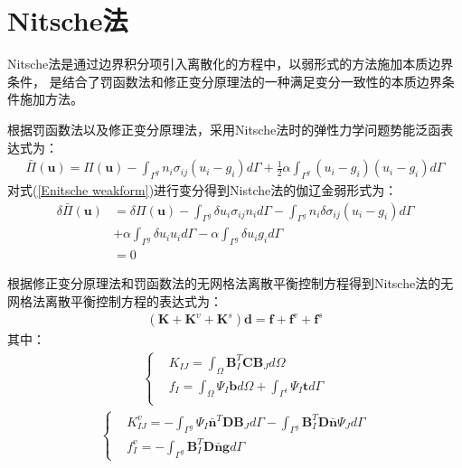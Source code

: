 \section{Nitsche法}
Nitsche法\cite{}是通过边界积分项引入离散化的方程中，以弱形式的方法施加本质边界条件，
是结合了罚函数法和修正变分原理法的一种满足变分一致性的本质边界条件施加方法。\par
根据罚函数法以及修正变分原理法，采用Nitsche法时的弹性力学问题势能泛函表达式为：
\begin{equation}\label{Enitsche weakform}
\begin{split}
    \bar{\Pi}(\pmb{u})=\Pi(\pmb{u})-\int_{\Gamma^g}n_i\sigma_{ij}(u_i-g_i)d\Gamma+\frac{1}{2}\alpha\int_{\Gamma^g}(u_i-g_i)(u_i-g_i)d\Gamma
\end{split}
\end{equation}
对式(\ref{Enitsche weakform})进行变分得到Nistche法的伽辽金弱形式为：
\begin{equation}
\begin{split}
    \delta\bar{\Pi}(\pmb{u})&=\delta\Pi(\pmb{u})-\int_{\Gamma^g}\delta u_i\sigma_{ij}n_id\Gamma-\int_{\Gamma^g}n_i\delta\sigma_{ij}(u_i-g_i)d\Gamma\\
&+\alpha\int_{\Gamma^g}\delta u_iu_id\Gamma-\alpha\int_{\Gamma^g}\delta u_i g_id\Gamma\\
&=0
\end{split}
\end{equation}\par
根据修正变分原理法和罚函数法的无网格法离散平衡控制方程得到Nitsche法的无网格法离散平衡控制方程的表达式为：
\begin{equation}
\begin{split}
    (\pmb{K}+\pmb{K}^v+\pmb{K}^s)\pmb{d}=\pmb{f}+\pmb{f}^v+\pmb{f}^s
\end{split}
\end{equation}
其中：
\begin{equation}
\begin{split}
\begin{cases}
   &K_{I\!J}=\int_{\Omega}\pmb{B}_I^T\pmb{C}\pmb{B}_Jd\Omega\\
   &f_I=\int_{\Omega}\Psi_I\pmb{b}d\Omega+\int_{\Gamma^t}\Psi_I\pmb{t}d\Gamma\\
\end{cases}
\end{split}
\end{equation}
\begin{equation}
\begin{split}    
    \begin{cases}
    &K^v_{I\!J}=-\int_{\Gamma^g}\Psi_I\bar{\pmb{n}}^T\pmb{D}\pmb{B}_Jd\Gamma-\int_{\Gamma^g}\pmb{B}_I^T\pmb{D}\bar{\pmb{n}}\Psi_Jd\Gamma\\
     &f^v_I=-\int_{\Gamma^g}\pmb{B}_I^T\pmb{D}\bar{\pmb{n}}\pmb{g}d\Gamma
    \end{cases}
\end{split}
\end{equation}

